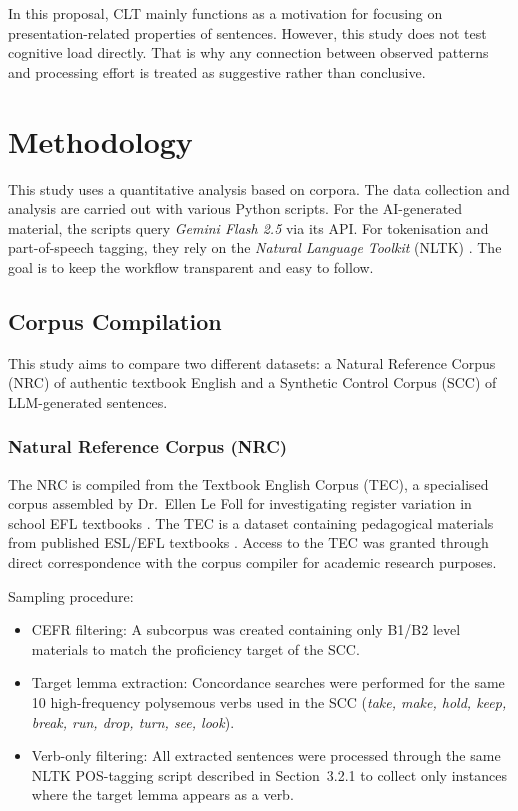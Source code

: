 In this proposal, CLT mainly functions as a motivation for focusing on presentation-related properties of sentences. However, this study does not test cognitive load directly. That is why any connection between observed patterns and processing effort is treated as suggestive rather than conclusive.

\section{Methodology}
This study uses a quantitative analysis based on corpora. The data collection and analysis are carried out with various Python scripts. For the AI-generated material, the scripts query \textit{Gemini Flash 2.5} via its API. For tokenisation and part-of-speech tagging, they rely on the \textit{Natural Language Toolkit} (NLTK) \parencite{birdKleinLoperNLP2009,loperBirdNLTK2002}. The goal is to keep the workflow transparent and easy to follow.

\subsection{Corpus Compilation}

This study aims to compare two different datasets: a Natural Reference Corpus (NRC) of authentic textbook English and a Synthetic Control Corpus (SCC) of LLM-generated sentences.

\subsubsection{Natural Reference Corpus (NRC)}

The NRC is compiled from the Textbook English Corpus (TEC), a specialised corpus assembled by Dr.\ Ellen Le Foll for investigating register variation in school EFL textbooks \parencite{leFoll2021b}. The TEC is a dataset containing pedagogical materials from published ESL/EFL textbooks \parencite{leFoll2021a}. Access to the TEC was granted through direct correspondence with the corpus compiler for academic research purposes.

Sampling procedure:
\begin{itemize}
    \item CEFR filtering: A subcorpus was created containing only B1/B2 level materials to match the proficiency target of the SCC.
    \item Target lemma extraction: Concordance searches were performed for the same 10 high-frequency polysemous verbs used in the SCC (\textit{take, make, hold, keep, break, run, drop, turn, see, look}).
    \item Verb-only filtering: All extracted sentences were processed through the same NLTK POS-tagging script described in Section~3.2.1 to collect only instances where the target lemma appears as a verb.
\end{itemize}

